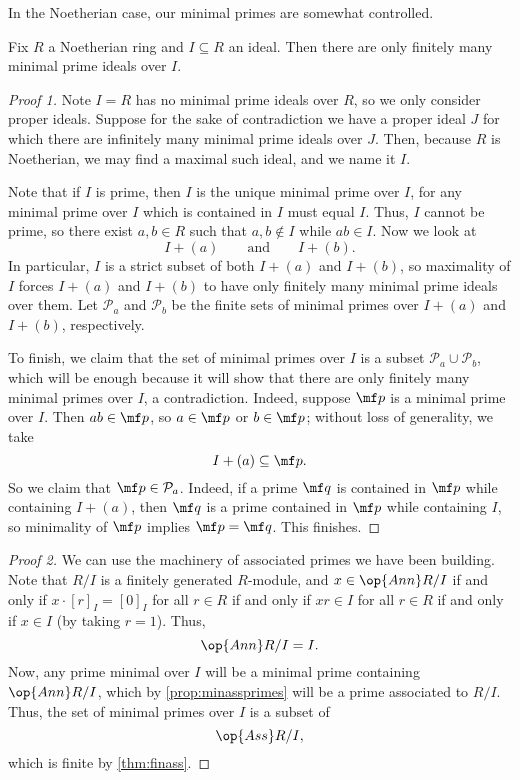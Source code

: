 \documentclass[../notes.tex]{subfiles}
\begin{document}
In the Noetherian case, our minimal primes are somewhat controlled.
\begin{prop} \label{prop:finminprimes}
	Fix $R$ a Noetherian ring and $I\subseteq R$ an ideal. Then there are only finitely many minimal prime ideals over $I$.
\end{prop}
\begin{proof}[Proof 1]
	Note $I=R$ has no minimal prime ideals over $R$, so we only consider proper ideals. Suppose for the sake of contradiction we have a proper ideal $J$ for which there are infinitely many minimal prime ideals over $J$. Then, because $R$ is Noetherian, we may find a maximal such ideal, and we name it $I$.
	
	Note that if $I$ is prime, then $I$ is the unique minimal prime over $I$, for any minimal prime over $I$ which is contained in $I$ must equal $I$. Thus, $I$ cannot be prime, so there exist $a,b\in R$ such that $a,b\notin I$ while $ab\in I$. Now we look at
	\[I+(a)\qquad\text{and}\qquad I+(b).\]
	In particular, $I$ is a strict subset of both $I+(a)$ and $I+(b)$, so maximality of $I$ forces $I+(a)$ and $I+(b)$ to have only finitely many minimal prime ideals over them. Let $\mathcal P_a$ and $\mathcal P_b$ be the finite sets of minimal primes over $I+(a)$ and $I+(b)$, respectively.

	To finish, we claim that the set of minimal primes over $I$ is a subset $\mathcal P_a\cup\mathcal P_b$, which will be enough because it will show that there are only finitely many minimal primes over $I$, a contradiction. Indeed, suppose $\mf p$ is a minimal prime over $I$. Then $ab\in\mf p$, so $a\in\mf p$ or $b\in\mf p$; without loss of generality, we take
	\[I+(a)\subseteq\mf p.\]
	So we claim that $\mf p\in\mathcal P_a$. Indeed, if a prime $\mf q$ is contained in $\mf p$ while containing $I+(a)$, then $\mf q$ is a prime contained in $\mf p$ while containing $I$, so minimality of $\mf p$ implies $\mf p=\mf q$. This finishes.
\end{proof}
\begin{proof}[Proof 2]
	We can use the machinery of associated primes we have been building. Note that $R/I$ is a finitely generated $R$-module, and $x\in\op{Ann}R/I$ if and only if $x\cdot[r]_I=[0]_I$ for all $r\in R$ if and only if $xr\in I$ for all $r\in R$ if and only if $x\in I$ (by taking $r=1$). Thus,
	\[\op{Ann}R/I=I.\]
	Now, any prime minimal over $I$ will be a minimal prime containing $\op{Ann}R/I$, which by \autoref{prop:minassprimes} will be a prime associated to $R/I$. Thus, the set of minimal primes over $I$ is a subset of
	\[\op{Ass}R/I,\]
	which is finite by \autoref{thm:finass}.
\end{proof}
\end{document}
